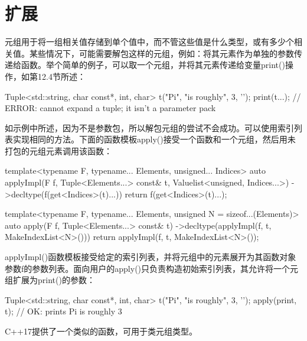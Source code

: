 \section{扩展}
元组用于将一组相关值存储到单个值中，而不管这些值是什么类型，或有多少个相关值。某些情况下，可能需要解包这样的元组，例如：将其元素作为单独的参数传递给函数。举个简单的例子，可以取一个元组，并将其元素传递给变量print()操作，如第12.4节所述：

\begin{cpp}
Tuple<std::string, char const*, int, char> t("Pi", "is roughly",
3, '\n');
print(t...); // ERROR: cannot expand a tuple; it isn't a parameter pack
\end{cpp}

如示例中所述，因为不是参数包，所以解包元组的尝试不会成功。可以使用索引列表实现相同的方法。下面的函数模板apply()接受一个函数和一个元组，然后用未打包的元组元素调用该函数：

\begin{cpp}
template<typename F, typename... Elements, unsigned... Indices>
auto applyImpl(F f, Tuple<Elements...> const& t,
					Valuelist<unsigned, Indices...>)
	->decltype(f(get<Indices>(t)...))
{
	return f(get<Indices>(t)...);
}

template<typename F, typename... Elements,
		unsigned N = sizeof...(Elements)>
auto apply(F f, Tuple<Elements...> const& t)
	->decltype(applyImpl(f, t, MakeIndexList<N>()))
{
	return applyImpl(f, t, MakeIndexList<N>());
}
\end{cpp}

applyImpl()函数模板接受给定的索引列表，并将元组中的元素展开为其函数对象参数f的参数列表。面向用户的apply()只负责构造初始索引列表，其允许将一个元组扩展为print()的参数：

\begin{cpp}
Tuple<std::string, char const*, int, char> t("Pi", "is roughly",
												3, '\n');
apply(print, t); // OK: prints Pi is roughly 3
\end{cpp}

C++17提供了一个类似的函数，可用于类元组类型。






































